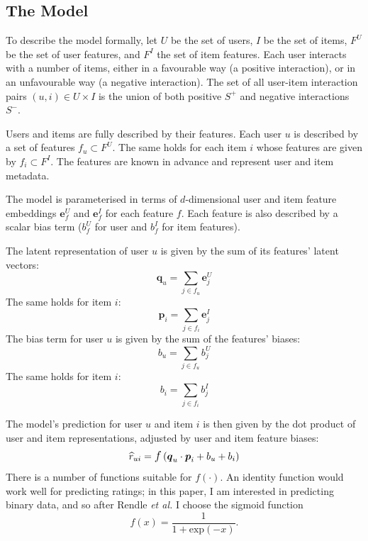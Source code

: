 \documentclass{sig-alternate}
\newcommand\symUserSet{U}
\newcommand\symItemSet{I}
\newcommand\symUserFeaturesSet{F^U}
\newcommand\symItemFeaturesSet{F^I}
\newcommand\symUserInteractionSet{S}
\begin{document}
\subsection{The Model}
To describe the model formally, let $\symUserSet$ be the set of users, $\symItemSet$ be the set of items, $\symUserFeaturesSet$ be the set of user features, and $\symItemFeaturesSet$ the set of item features. Each user interacts with a number of items, either in a favourable way (a positive interaction), or in an unfavourable way (a negative interaction). The set of all user-item interaction pairs $(u, i) \in \symUserSet \times \symItemSet$ is the union of both positive $\symUserInteractionSet^+$ and negative interactions $\symUserInteractionSet^-$. 

Users and items are fully described by their features. Each user $u$ is described by a set of features $f_u \subset \symUserFeaturesSet$. The same holds for each item $i$ whose features are given by $f_i \subset \symItemFeaturesSet$. The features are known in advance and represent user and item metadata.

The model is parameterised in terms of $d$-dimensional user and item feature embeddings $\boldsymbol{e}^U_f$ and $\boldsymbol{e}^I_f$ for each feature $f$. Each feature is also described by a scalar bias term ($b^U_f$ for user and $b^I_f$ for item features).

The latent representation of user $u$ is given by the sum of its features' latent vectors:
\begin{equation*}
\boldsymbol{q}_u = \sum_{j \in f_u}\boldsymbol{e}^U_j 
\end{equation*}
The same holds for item $i$:
\begin{equation*}
\boldsymbol{p}_i = \sum_{j \in f_i}\boldsymbol{e}^I_j
\end{equation*}
The bias term for user $u$ is given by the sum of the features' biases:
\begin{equation*}
b_u = \sum_{j \in f_u}b^U_j 
\end{equation*}
The same holds for item $i$:
\begin{equation*}
b_i = \sum_{j \in f_i}b^I_j
\end{equation*}

The model's prediction for user $u$ and item $i$ is then given by the dot product of user and item representations, adjusted by user and item feature biases:
\begin{equation}
\widehat{r}_{ui} = \mbox{\large $f$} \left(\boldsymbol{q}_u \cdot \boldsymbol{p}_i + b_u + b_i\right)
\end{equation}
There is a number of functions suitable for $f(\cdot)$. An identity function would work well for predicting ratings; in this paper, I am interested in predicting binary data, and so after Rendle \textit{et al.} \cite{rendle2009bpr} I choose the sigmoid function
\begin{equation*}
f(x) = \frac{1}{1 + \mathrm{exp}(-x)}.
\end{equation*}
\end{document}
